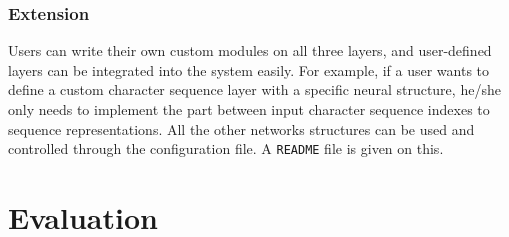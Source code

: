 \documentclass[11pt,a4paper]{article}
\begin{document}
\subsubsection{Extension}
Users can write their own custom modules on all three layers, and user-defined layers can be integrated into the system easily. For example, if a user wants to define a custom character sequence layer with a specific neural structure, he/she only needs to implement the part between input character sequence indexes to sequence representations. All the other networks structures can be used and controlled through the configuration file. A \texttt{README} file is given on this.


\begin{table}[!tp]
\begin{center}
\end{center}
\caption{Results on three benchmarks.}
\label{tab:allresult}
\end{table}

\section{Evaluation} \label{sec:eva}
\end{document}

